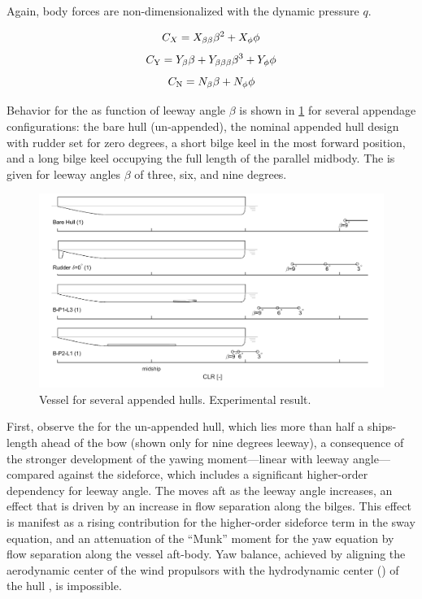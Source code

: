\documentclass[twoside,twocolumn]{article}
\begin{document}
	\noindent
	Again, body forces are non-dimensionalized with the dynamic pressure $q$.
	
	
	\begin{equation}
	C_{X}=X_{\beta \beta}\beta^{2}+X_{\phi}\phi
	\end{equation}
	\begin{equation}
	C_\mathrm{Y}=Y_{\beta}\beta+Y_{\beta \beta \beta}\beta^{3}+Y_{\phi}\phi
	\end{equation}
	\begin{equation}
	C_\mathrm{N}=N_{\beta}\beta+N_{\phi}\phi
	\end{equation}
	
	Behavior for the \CLR as function of leeway angle $\beta$ is shown in \cref{fig:CLRdemo} for several appendage configurations: the bare hull (un-appended), the nominal appended hull design with rudder set for zero degrees, a short bilge keel in the most forward position, and a long bilge keel occupying the full length of the parallel midbody. The \CLR is given for leeway angles $\beta$ of three, six, and nine degrees. 
	
	\begin{figure}[!th]
		\centering
		\includegraphics[width=\textwidth]{images/1_CLR_demo}
		\caption{Vessel \CLR for several appended hulls. Experimental result.}
		\label{fig:CLRdemo}
	\end{figure}
	\noindent
	First, observe the \CLR for the un-appended hull, which lies more than half a ships-length ahead of the bow (shown only for nine degrees leeway), a consequence of the stronger development of the yawing moment—linear with leeway angle—compared against the sideforce, which includes a significant higher-order dependency for leeway angle. The \CLR moves aft as the leeway angle increases, an effect that is driven by an increase in flow separation along the bilges. This effect is manifest as a rising contribution for the higher-order sideforce term in the sway equation, and an attenuation of the “Munk” moment for the yaw equation by flow separation along the vessel aft-body. Yaw balance, achieved by aligning the aerodynamic center of the wind propulsors with the hydrodynamic center (\CLR) of the hull \cite{Claughton03}, is impossible.
	
\end{document}
